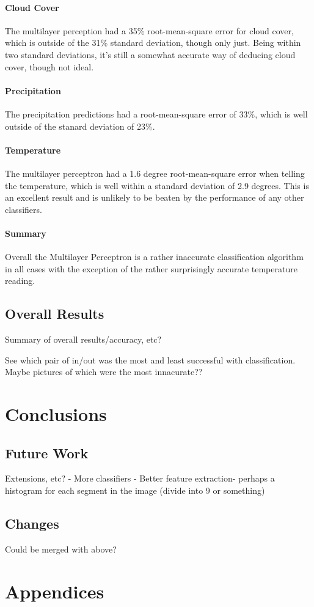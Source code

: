 \documentclass[a4paper,12pt,twoside]{report}
\begin{document}
\subsubsection{Cloud Cover}
The multilayer perception had a 35\% root-mean-square error for cloud cover, which is outside of the 31\% standard deviation, though only just. Being within two standard deviations, it's still a somewhat accurate way of deducing cloud cover, though not ideal.

\subsubsection{Precipitation}
The precipitation predictions had a root-mean-square error of 33\%, which is well outside of the stanard deviation of 23\%. 

\subsubsection{Temperature}
The multilayer perceptron had a 1.6 degree root-mean-square error when telling the temperature, which is well within a standard deviation of 2.9 degrees. This is an excellent result and is unlikely to be beaten by the performance of any other classifiers.

\subsubsection{Summary}
Overall the Multilayer Perceptron is a rather inaccurate classification algorithm in all cases with the exception of the rather surprisingly accurate temperature reading.

\section{Overall Results}
Summary of overall results/accuracy, etc?

See which pair of in/out was the most and least successful with classification.
Maybe pictures of which were the most innacurate??

\chapter{Conclusions}

\section{Future Work}
Extensions, etc?
- More classifiers
- Better feature extraction- perhaps a histogram for each segment in the image (divide into 9 or something)

\section{Changes}
Could be merged with above?


{}

\chapter{Appendices}



\end{document}
